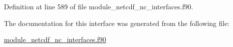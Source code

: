 Definition at line 589 of file module\+\_\+netcdf\+\_\+nc\+\_\+interfaces.\+f90.



The documentation for this interface was generated from the following file\+:\begin{DoxyCompactItemize}
\item 
\hyperlink{module__netcdf__nc__interfaces_8f90}{module\+\_\+netcdf\+\_\+nc\+\_\+interfaces.\+f90}\end{DoxyCompactItemize}
